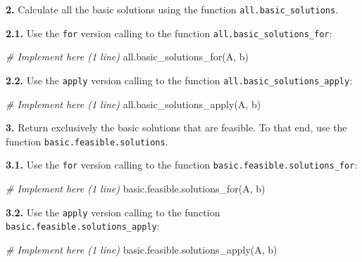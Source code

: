 \documentclass[
]{article}
\newenvironment{Shaded}{\begin{snugshade}}{\end{snugshade}}
\newcommand{\CommentTok}[1]{\textcolor[rgb]{0.56,0.35,0.01}{\textit{#1}}}
\newcommand{\FunctionTok}[1]{\textcolor[rgb]{0.00,0.00,0.00}{#1}}
\newcommand{\NormalTok}[1]{#1}
\begin{document}
\textbf{2.} Calculate all the basic solutions using the function
\texttt{all.basic\_solutions}.

\textbf{2.1.} Use the \texttt{for} version calling to the function
\texttt{all.basic\_solutions\_for}:

\begin{Shaded}
\begin{Highlighting}[]
\CommentTok{\# Implement here (1 line)}
\FunctionTok{all.basic\_solutions\_for}\NormalTok{(A, b)}
\end{Highlighting}
\end{Shaded}

\textbf{2.2.} Use the \texttt{apply} version calling to the function
\texttt{all.basic\_solutions\_apply}:

\begin{Shaded}
\begin{Highlighting}[]
\CommentTok{\# Implement here (1 line)}
\FunctionTok{all.basic\_solutions\_apply}\NormalTok{(A, b)}
\end{Highlighting}
\end{Shaded}

\textbf{3.} Return exclusively the basic solutions that are feasible. To
that end, use the function \texttt{basic.feasible.solutions}.

\textbf{3.1.} Use the \texttt{for} version calling to the function
\texttt{basic.feasible.solutions\_for}:

\begin{Shaded}
\begin{Highlighting}[]
\CommentTok{\# Implement here (1 line)}
\FunctionTok{basic.feasible.solutions\_for}\NormalTok{(A, b)}
\end{Highlighting}
\end{Shaded}

\textbf{3.2.} Use the \texttt{apply} version calling to the function
\texttt{basic.feasible.solutions\_apply}:

\begin{Shaded}
\begin{Highlighting}[]
\CommentTok{\# Implement here (1 line)}
\FunctionTok{basic.feasible.solutions\_apply}\NormalTok{(A, b)}
\end{Highlighting}
\end{Shaded}
\end{document}
